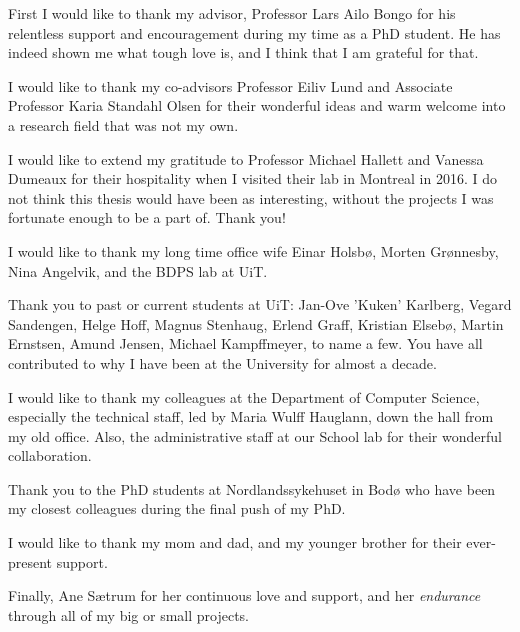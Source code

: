 \begin{acknowledgement}

    First I would like to thank my advisor, Professor Lars Ailo Bongo for his
    relentless support and encouragement during my time as a PhD student. He has
    indeed shown me what tough love is, and I think that I am grateful for that. 

    I would like to thank my co-advisors Professor Eiliv Lund and Associate
    Professor Karia Standahl Olsen for their wonderful ideas and warm welcome
    into a research field that was not my own. 

    I would like to extend my gratitude to Professor Michael Hallett and Vanessa
    Dumeaux for their hospitality when I visited their lab in Montreal in
    2016. I do not think this thesis would have been as interesting, without the
    projects I was fortunate enough to be a part of. Thank you! 

    I would like to thank my long time office wife Einar Holsbø, Morten
    Grønnesby, Nina Angelvik, and the BDPS lab at UiT. 

    Thank you to past or current students at UiT: Jan-Ove 'Kuken' Karlberg,
    Vegard Sandengen, Helge Hoff, Magnus Stenhaug, Erlend Graff, Kristian
    Elsebø, Martin Ernstsen, Amund Jensen, Michael Kampffmeyer, to name a few.
    You have all contributed to why I have been at the University for almost a
    decade.
    
    I would like to thank my colleagues at the Department of Computer Science,
    especially the technical staff, led by Maria Wulff Hauglann, down the hall
    from my old office. Also, the administrative staff at our School lab for
    their wonderful collaboration. 

    Thank you to the PhD students at Nordlandssykehuset in Bodø who have been my
    closest colleagues during the final push of my PhD. 
    
    I would like to thank my mom and dad, and my younger brother for their
    ever-present support. 

    Finally, Ane Sætrum for her continuous love and support, and her
    \emph{endurance} through all of my big or small projects. 




\end{acknowledgement}


